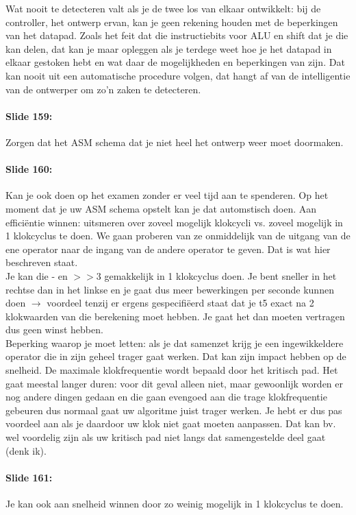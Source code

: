 \documentclass[10pt,a4paper]{book}
\begin{document}
Wat nooit te detecteren valt als je de twee los van elkaar ontwikkelt: bij de controller, het ontwerp ervan, kan je geen rekening houden met de beperkingen van het datapad. Zoals het feit dat die instructiebits voor ALU en shift dat je die kan delen, dat kan je maar opleggen als je terdege weet hoe je het datapad in elkaar gestoken hebt en wat daar de mogelijkheden en beperkingen van zijn. Dat kan nooit uit een automatische procedure volgen, dat hangt af van de intelligentie van de ontwerper om zo'n zaken te detecteren.

\paragraph{Slide 159:} Zorgen dat het ASM schema dat je niet heel het ontwerp weer moet doormaken. 

\paragraph{Slide 160:} Kan je ook doen op het examen zonder er veel tijd aan te spenderen. Op het moment dat je uw ASM schema opstelt kan je dat automstisch doen. Aan effici\"entie winnen: uitsmeren over zoveel mogelijk klokcycli vs. zoveel mogelijk in 1 klokcyclus te doen. We gaan proberen van ze onmiddelijk van de uitgang van de ene operator naar de ingang van de andere operator te geven. Dat is wat hier beschreven staat.\\
Je kan die - en $>>3$ gemakkelijk in 1 klokcyclus doen. Je bent sneller in het rechtse dan in het linkse en je gaat dus meer bewerkingen per seconde kunnen doen $\rightarrow$ voordeel tenzij er ergens gespecifi\"eerd staat dat je t5 exact na 2 klokwaarden van die berekening moet hebben. Je gaat het dan moeten vertragen dus geen winst hebben.\\
Beperking waarop je moet letten: als je dat samenzet krijg je een ingewikkeldere operator die in zijn geheel trager gaat werken. Dat kan zijn impact hebben op de snelheid. De maximale klokfrequentie wordt bepaald door het kritisch pad. Het gaat meestal langer duren: voor dit geval alleen niet, maar gewoonlijk worden er nog andere dingen gedaan en die gaan evengoed aan die trage klokfrequentie gebeuren dus normaal gaat uw algoritme juist trager werken. Je hebt er dus pas voordeel aan als je daardoor uw klok niet gaat moeten aanpassen. Dat kan bv. wel voordelig zijn als uw kritisch pad niet langs dat samengestelde deel gaat (denk ik).

\paragraph{Slide 161:} Je kan ook aan snelheid winnen door zo weinig mogelijk in 1 klokcyclus te doen. 
\end{document}
